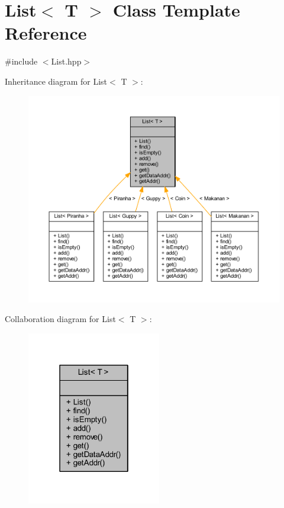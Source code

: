 \hypertarget{class_list}{}\section{List$<$ T $>$ Class Template Reference}
\label{class_list}


{\ttfamily \#include $<$List.\+hpp$>$}



Inheritance diagram for List$<$ T $>$\+:
\nopagebreak
\begin{figure}[H]
\begin{center}
\leavevmode
\includegraphics[width=350pt]{class_list__inherit__graph}
\end{center}
\end{figure}


Collaboration diagram for List$<$ T $>$\+:
\nopagebreak
\begin{figure}[H]
\begin{center}
\leavevmode
\includegraphics[width=166pt]{class_list__coll__graph}
\end{center}
\end{figure}
